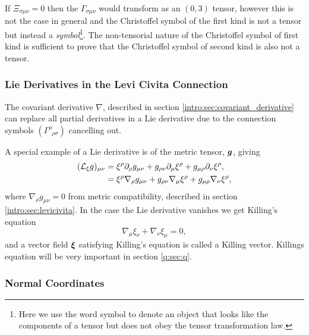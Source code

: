If $\Xi_{\sigma\mu\nu}=0$ then the $\Gamma_{\sigma\mu\nu}$ would transform as an $(0,3)$ tensor, however this is not the case in general and the Christoffel symbol of the first kind is not a tensor but instead a {\it symbol}\footnote{Here we use the word symbol to denote an object that looks like the components of a tensor but does not obey the tensor transformation law.}. The non-tensorial nature of the Christoffel symbol of first kind is sufficient to prove that the Christoffel symbol of second kind is also not a tensor.


\subsubsection{Lie Derivatives in the Levi Civita Connection}

The covariant derivative $\nabla$, described in section \ref{intro:sec:covariant_derivative} can replace all partial derivatives in a Lie derivative due to the connection symbols $\left( \Gamma^\mu_{\,\,\,\rho\sigma}\right)$ cancelling out.

A special example of a Lie derivative is of the metric tensor, $\boldsymbol{g}$, giving
\begin{align}
(\mathcal{L}_\xi g)_{\mu\nu} &= \xi^\rho \partial_\rho g_{\mu\nu} + g_{\rho\nu}\partial_\mu \xi^\rho + g_{\mu\rho}\partial_\nu \xi^\rho, \\
&= \xi^\rho {\nabla_\rho g_{\mu\nu}} + g_{\rho\nu}\nabla_\mu \xi^\rho  + g_{\mu\rho}\nabla_\nu \xi^\rho, 
\end{align}
where $\nabla_\rho g_{\mu\nu}=0$ from metric compatibility, described in section \ref{intro:sec:levicivita}. In the case the Lie derivative vanishes we get Killing's equation
\begin{equation}
\nabla_{\mu}\xi_\nu + \nabla_\nu \xi_\mu =0,
\end{equation} 
and a vector field $\boldsymbol\xi$ satisfying Killing's equation is called a Killing vector. Killings equation will be very important in section \ref{q:sec:q}.

\subsubsection{Normal Coordinates} \label{intro:sec:normal_coords}

